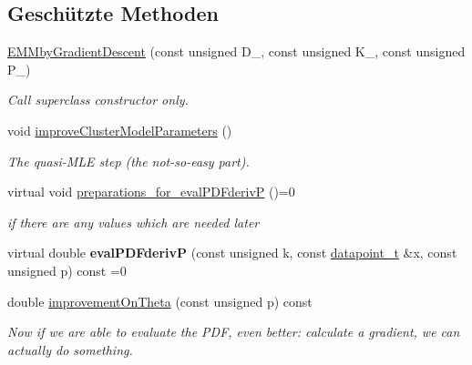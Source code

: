 \subsection*{Geschützte Methoden}
\begin{DoxyCompactItemize}
\item 
\hypertarget{classCDA_1_1EMMbyGradientDescent_a82aceae146cbddfd123f8acfce0929bd}{
\hyperlink{classCDA_1_1EMMbyGradientDescent_a82aceae146cbddfd123f8acfce0929bd}{EMMbyGradientDescent} (const unsigned D\_\-, const unsigned K\_\-, const unsigned P\_\-)}
\label{classCDA_1_1EMMbyGradientDescent_a82aceae146cbddfd123f8acfce0929bd}

\begin{DoxyCompactList}\small\item\em Call superclass constructor only. \item\end{DoxyCompactList}\item 
void \hyperlink{classCDA_1_1EMMbyGradientDescent_ae948fd6ba3080c1f484b3fb5a262f587}{improveClusterModelParameters} ()
\begin{DoxyCompactList}\small\item\em The quasi-\/MLE step (the not-\/so-\/easy part). \item\end{DoxyCompactList}\item 
virtual void \hyperlink{classCDA_1_1EMMbyGradientDescent_ad089403a73bd611cec7b40da92e4adb9}{preparations\_\-for\_\-evalPDFderivP} ()=0
\begin{DoxyCompactList}\small\item\em if there are any values which are needed later \item\end{DoxyCompactList}\item 
\hypertarget{classCDA_1_1EMMbyGradientDescent_ab78ea4c1993c56d9995aede4e6d02a65}{
virtual double {\bfseries evalPDFderivP} (const unsigned k, const \hyperlink{classCDA_1_1EMGenericMixtureModelCore_a59c8aa9101530e99b1392d848fd50357}{datapoint\_\-t} \&x, const unsigned p) const =0}
\label{classCDA_1_1EMMbyGradientDescent_ab78ea4c1993c56d9995aede4e6d02a65}

\item 
double \hyperlink{classCDA_1_1EMMbyGradientDescent_a9069cb24c24f1c6021d749bd4e0dd7e6}{improvementOnTheta} (const unsigned p) const 
\begin{DoxyCompactList}\small\item\em Now if we are able to evaluate the PDF, even better: calculate a gradient, we can actually do something. \item\end{DoxyCompactList}\end{DoxyCompactItemize}


